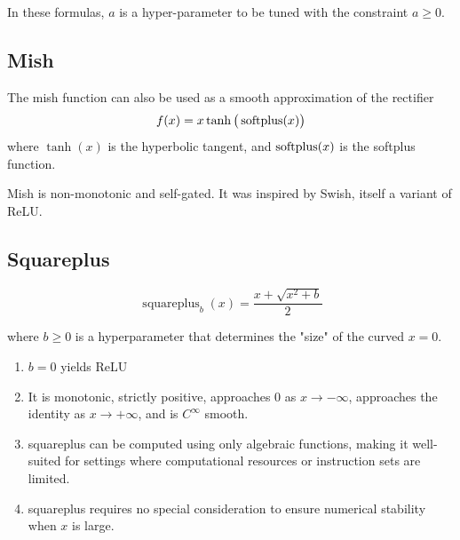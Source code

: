 In these formulas, \(\displaystyle a\) is a hyper-parameter to be tuned with the constraint \(\displaystyle a\geq 0\).

\subsection{Mish \cite{wiki-Rectifier}}\label{Mish}
The mish function can also be used as a smooth approximation of the rectifier
\[
    \displaystyle f(x)=x\tanh {\big (}\operatorname{softplus} (x){\big )}
\]
where \({\displaystyle \tanh(x)}\) is the hyperbolic tangent, and \({\displaystyle \operatorname{softplus}(x)}\) is the softplus function.\par
Mish is non-monotonic and self-gated. It was inspired by Swish, itself a variant of ReLU.

\subsection{Squareplus \cite{wiki-Rectifier}}\label{Squareplus}
\[
    {\displaystyle \operatorname {squareplus} _{b}(x)={\dfrac {x+{\sqrt {x^{2}+b}}}{2}}}
\]

where \({\displaystyle b\geq 0}\) is a hyperparameter that determines the "size" of the curved \({\displaystyle x=0}\).

\begin{enumerate}
    \item $b=0$ yields ReLU
    \item It is monotonic, strictly positive, approaches 0 as \({\displaystyle x\to -\infty }\), approaches the identity as \({\displaystyle x\to +\infty }\), and is \({\displaystyle C^{\infty }}\) smooth.
    \item squareplus can be computed using only algebraic functions, making it well-suited for settings where computational resources or instruction sets are limited.
    \item squareplus requires no special consideration to ensure numerical stability when \({\displaystyle x}\) is large.
\end{enumerate}






















































